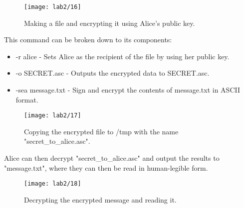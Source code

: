 \begin{figure}[H]
    \centering
    \texttt{[image: lab2/16]}
    \caption{Making a file and encrypting it using Alice's public key.}
    \label{fig:encLab2Msg}
\end{figure}

This command can be broken down to its components:
\begin{itemize}
    \item -r alice - Sets Alice as the recipient of the file by using her public key.
    \item -o SECRET.asc - Outputs the encrypted data to SECRET.asc.
    \item -sea message.txt - Sign and encrypt the contents of message.txt in ASCII format.
\end{itemize}

\begin{figure}[H]
    \centering
    \texttt{[image: lab2/17]}
    \caption{Copying the encrypted file to /tmp with the name "secret\_to\_alice.asc".}
    \label{fig:copyLab2Msg}
\end{figure}

Alice can then decrypt "secret\_to\_alice.asc" and output the results to "message.txt", where they can then
be read in human-legible form.

\begin{figure}[H]
    \centering
    \texttt{[image: lab2/18]}
    \caption{Decrypting the encrypted message and reading it.}
    \label{fig:decryptLab2Msg}
\end{figure}
